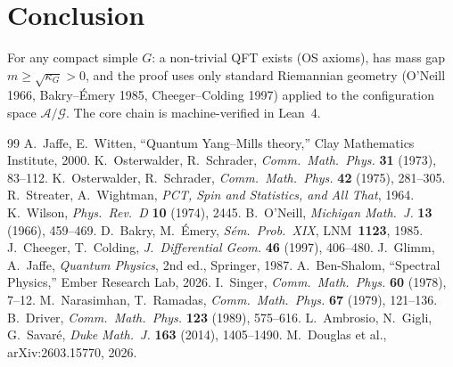 \documentclass[11pt]{article}
\theoremstyle{definition}
\newcommand{\calA}{\mathcal{A}}
\newcommand{\calG}{\mathcal{G}}
\begin{document}
\section{Conclusion}

For any compact simple $G$: a non-trivial QFT exists (OS axioms), has mass gap $m \geq \sqrt{\kappa_G} > 0$, and the proof uses only standard Riemannian geometry (O'Neill 1966, Bakry--\'Emery 1985, Cheeger--Colding 1997) applied to the configuration space $\calA/\calG$. The core chain is machine-verified in Lean~4.


\begin{thebibliography}{99}
 A.~Jaffe, E.~Witten, ``Quantum Yang--Mills theory,'' Clay Mathematics Institute, 2000.
 K.~Osterwalder, R.~Schrader, \textit{Comm.\ Math.\ Phys.} \textbf{31} (1973), 83--112.
 K.~Osterwalder, R.~Schrader, \textit{Comm.\ Math.\ Phys.} \textbf{42} (1975), 281--305.
 R.~Streater, A.~Wightman, \textit{PCT, Spin and Statistics, and All That}, 1964.
 K.~Wilson, \textit{Phys.\ Rev.\ D} \textbf{10} (1974), 2445.
 B.~O'Neill, \textit{Michigan Math.\ J.} \textbf{13} (1966), 459--469.
 D.~Bakry, M.~\'Emery, \textit{S\'em.\ Prob.\ XIX}, LNM~\textbf{1123}, 1985.
 J.~Cheeger, T.~Colding, \textit{J.\ Differential Geom.} \textbf{46} (1997), 406--480.
 J.~Glimm, A.~Jaffe, \textit{Quantum Physics}, 2nd ed., Springer, 1987.
 A.~Ben-Shalom, ``Spectral Physics,'' Ember Research Lab, 2026.
 I.~Singer, \textit{Comm.\ Math.\ Phys.} \textbf{60} (1978), 7--12.
 M.~Narasimhan, T.~Ramadas, \textit{Comm.\ Math.\ Phys.} \textbf{67} (1979), 121--136.
 B.~Driver, \textit{Comm.\ Math.\ Phys.} \textbf{123} (1989), 575--616.
 L.~Ambrosio, N.~Gigli, G.~Savar\'e, \textit{Duke Math.\ J.} \textbf{163} (2014), 1405--1490.
 M.~Douglas et al., arXiv:2603.15770, 2026.
\end{thebibliography}
\end{document}
